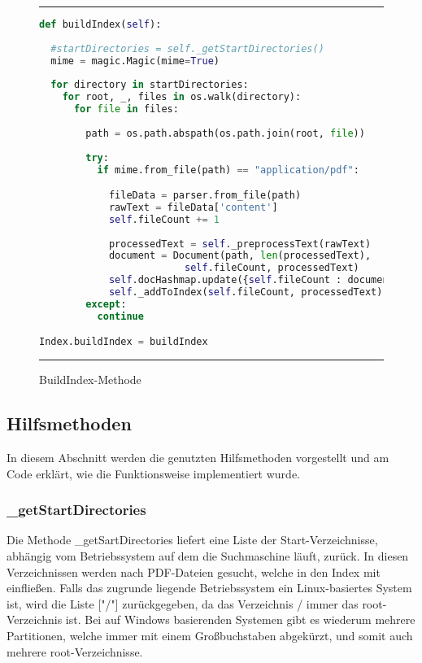 \begin{figure}[h]
	\rule{\textwidth}{0.4pt}
		\begin{lstlisting}[language=Python]
def buildIndex(self):
    
  #startDirectories = self._getStartDirectories()
  mime = magic.Magic(mime=True)
    
  for directory in startDirectories:
    for root, _, files in os.walk(directory):
      for file in files:
                
        path = os.path.abspath(os.path.join(root, file))
                
        try:
          if mime.from_file(path) == "application/pdf":

            fileData = parser.from_file(path)
            rawText = fileData['content']
            self.fileCount += 1
                    
            processedText = self._preprocessText(rawText)
            document = Document(path, len(processedText),
                         self.fileCount, processedText)
            self.docHashmap.update({self.fileCount : document})
            self._addToIndex(self.fileCount, processedText)
        except:
          continue

Index.buildIndex = buildIndex
		\end{lstlisting}
	\rule{\textwidth}{0.4pt}
	\caption{BuildIndex-Methode}
	\label{fig:build}
\end{figure}

\subsection{Hilfsmethoden}\label{hilfsmethoden}

In diesem Abschnitt werden die genutzten Hilfsmethoden vorgestellt und am Code erklärt, wie die Funktionsweise implementiert wurde.

\subsubsection{\_getStartDirectories}

Die Methode \_getSartDirectories liefert eine Liste der Start-Verzeichnisse, abhängig vom Betriebssystem auf dem die Suchmaschine läuft, zurück. In diesen Verzeichnissen werden nach PDF-Dateien gesucht, welche in den Index mit einfließen. Falls das zugrunde liegende Betriebssystem ein Linux-basiertes System ist, wird die Liste ["/"] zurückgegeben, da das Verzeichnis / immer das root-Verzeichnis ist. Bei auf Windows basierenden Systemen gibt es wiederum mehrere Partitionen, welche immer mit einem Großbuchstaben abgekürzt, und somit auch mehrere root-Verzeichnisse.

